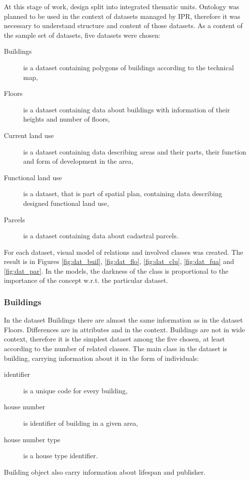 \documentclass{lncs-template/llncs}
\begin{document}
At this stage of work, design split into integrated thematic units. Ontology was planned to be used in the context of datasets managed by IPR, therefore it was necessary to understand structure and content of those datasets. As a content of the sample set of datasets, five datasets were chosen:
\begin{description}
 \item[Buildings] is a dataset containing polygons of buildings according to the technical map,
 \item[Floors] is a dataset containing data about buildings with information of their heights and number of floors,
 \item[Current land use] is a dataset containing data describing areas and their parts, their function and form of development in the area,
 \item[Functional land use] is a dataset, that is part of spatial plan, containing data describing designed functional land use,
 \item[Parcels] is a dataset containing data about cadastral parcels.
\end{description}
For each dataset, visual model of relations and involved classes was created. The result is in Figures \ref{fig:dat_buil}, \ref{fig:dat_flo}, \ref{fig:dat_clu}, \ref{fig:dat_fua} and \ref{fig:dat_par}. In the models, the darkness of the class is proportional to the importance of the concept w.r.t. the particular dataset.

\subsubsection{Buildings}

In the dataset Buildings there are almost the same information as in the dataset Floors. Differences are in attributes and in the context. Buildings are not in wide context, therefore it is the simplest dataset among the five chosen, at least according to the number of related classes. The main class in the dataset is building, carrying information about it in the form of individuals:
\begin{description}
\item[identifier] is a unique code for every building, 
\item[house number] is identifier of building in a given area,
\item[house number type] is a house type identifier.
\end{description}
Building object also carry information about lifespan and publisher.
\end{document}
